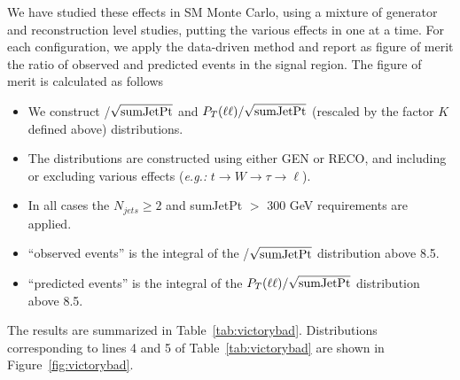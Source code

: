 We have studied these effects in SM Monte Carlo, using a mixture of generator and
reconstruction level studies, putting the various effects in one at a time.
For each configuration, we apply the data-driven method and report as figure
of merit the ratio of observed and predicted events in the signal region.
The figure of merit is calculated as follows
\begin{itemize}
\item We construct \met/$\sqrt{{\rm sumJetPt}}$ 
and $P_T(\ell \ell)/\sqrt{{\rm sumJetPt}}$ (rescaled by the factor $K$ defined
above) distributions.  
\item The distributions are constructed using either
GEN or RECO, and including or excluding various effects ({\em e.g.:} 
$t \to W \to \tau \to \ell$).  
\item In all cases the $N_{jets} \ge 2$ and 
sumJetPt $>$ 300 GeV requirements are applied.
\item ``observed events'' is the integral of the \met/$\sqrt{{\rm sumJetPt}}$ distribution
above 8.5.
\item ``predicted events'' is the integral of the $P_T(\ell \ell)/\sqrt{{\rm sumJetPt}}$ distribution
above 8.5.
\end{itemize}
The results are summarized in Table~\ref{tab:victorybad}.  Distributions corresponding to 
lines 4 and 5 of Table~\ref{tab:victorybad} are shown in Figure~\ref{fig:victorybad}.

